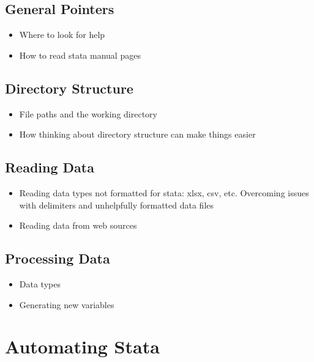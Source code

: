 \documentclass{scrartcl}
\begin{document}
\subsection{General Pointers}
\begin{itemize}
\item Where to look for help
\item How to read stata manual pages
\end{itemize}

\subsection{Directory Structure}

\begin{itemize}
\item File paths and the working directory
\item How thinking about directory structure can make things easier
\end{itemize}

\subsection{Reading Data}
\begin{itemize}
\item Reading data types not formatted for stata: xlsx, csv, etc. Overcoming issues with delimiters and unhelpfully formatted data files
\item Reading data from web sources
\end{itemize}

\subsection{Processing Data}
\begin{itemize}
\item Data types
\item Generating new variables
\end{itemize}

\section{Automating Stata}
\end{document}
